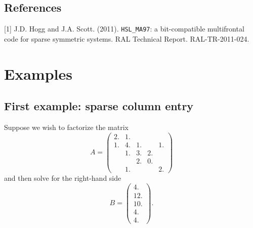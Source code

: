 \documentclass{spral}
\begin{document}
\subsection*{References}
[1] J.D. Hogg and J.A. Scott. (2011).
{\tt HSL\_MA97}: a bit-compatible multifrontal code for sparse symmetric
systems.
RAL Technical Report. RAL-TR-2011-024.




\section{Examples} \label{examples}

\subsection{First example: sparse column entry}
Suppose we wish to factorize the matrix
\[ A = \left(
\begin{array}{ccccc}
2. & 1. \\
1. & 4. & 1. & & 1. \\
 & 1. & 3. & 2. \\
& & 2. & 0. &  \\
& 1. & & & 2.
\end{array}
\right)
\]
and then solve for the right-hand side
\[ B = \left(
\begin{array}{c}
4. \\
12. \\
10. \\
4. \\
4.
\end{array}
\right).
\]
\end{document}
